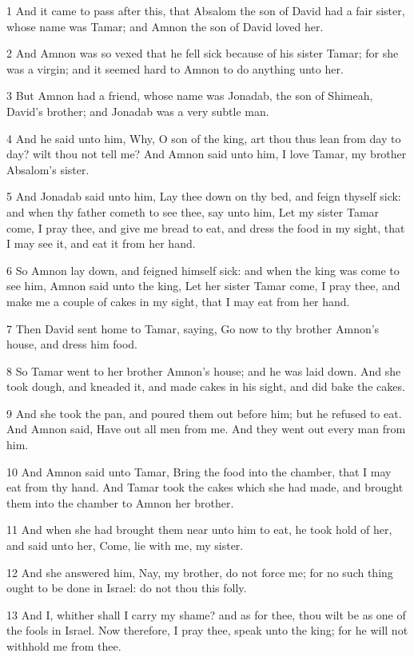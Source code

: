 \par 1 And it came to pass after this, that Absalom the son of David had a fair sister, whose name was Tamar; and Amnon the son of David loved her.
\par 2 And Amnon was so vexed that he fell sick because of his sister Tamar; for she was a virgin; and it seemed hard to Amnon to do anything unto her.
\par 3 But Amnon had a friend, whose name was Jonadab, the son of Shimeah, David's brother; and Jonadab was a very subtle man.
\par 4 And he said unto him, Why, O son of the king, art thou thus lean from day to day? wilt thou not tell me? And Amnon said unto him, I love Tamar, my brother Absalom's sister.
\par 5 And Jonadab said unto him, Lay thee down on thy bed, and feign thyself sick: and when thy father cometh to see thee, say unto him, Let my sister Tamar come, I pray thee, and give me bread to eat, and dress the food in my sight, that I may see it, and eat it from her hand.
\par 6 So Amnon lay down, and feigned himself sick: and when the king was come to see him, Amnon said unto the king, Let her sister Tamar come, I pray thee, and make me a couple of cakes in my sight, that I may eat from her hand.
\par 7 Then David sent home to Tamar, saying, Go now to thy brother Amnon's house, and dress him food.
\par 8 So Tamar went to her brother Amnon's house; and he was laid down. And she took dough, and kneaded it, and made cakes in his sight, and did bake the cakes.
\par 9 And she took the pan, and poured them out before him; but he refused to eat. And Amnon said, Have out all men from me. And they went out every man from him.
\par 10 And Amnon said unto Tamar, Bring the food into the chamber, that I may eat from thy hand. And Tamar took the cakes which she had made, and brought them into the chamber to Amnon her brother.
\par 11 And when she had brought them near unto him to eat, he took hold of her, and said unto her, Come, lie with me, my sister.
\par 12 And she answered him, Nay, my brother, do not force me; for no such thing ought to be done in Israel: do not thou this folly.
\par 13 And I, whither shall I carry my shame? and as for thee, thou wilt be as one of the fools in Israel. Now therefore, I pray thee, speak unto the king; for he will not withhold me from thee.
